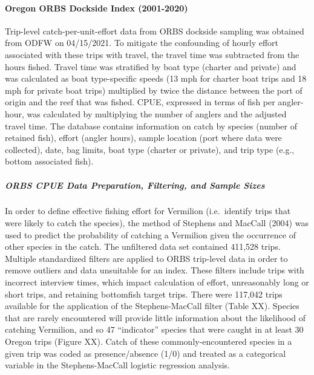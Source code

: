 \documentclass[11pt,
  english,
  a4paper,
]{article}
\begin{document}
\leavevmode\tagmcend\tagstructend


\hypertarget{oregon-orbs-dockside-index-2001-2020}{%
\paragraph{Oregon ORBS Dockside Index (2001-2020)}\label{oregon-orbs-dockside-index-2001-2020}}

\leavevmode\tagmcend\tagstructend


Trip-level catch-per-unit-effort data from ORBS dockside sampling was obtained from ODFW on 04/15/2021. To mitigate the confounding of hourly effort associated with these trips with travel, the travel time was subtracted from the hours fished. Travel time was stratified by boat type (charter and private) and was calculated as boat type-specific speeds (13 mph for charter boat trips and 18 mph for private boat trips) multiplied by twice the distance between the port of origin and the reef that was fished. CPUE, expressed in terms of fish per angler-hour, was calculated by multiplying the number of anglers and the adjusted travel time. The database contains information on catch by species (number of retained fish), effort (angler hours), sample location (port where data were collected), date, bag limits, boat type (charter or private), and trip type (e.g., bottom associated fish).

\leavevmode\tagmcend\tagstructend\par


\hypertarget{orbs-cpue-data-preparation-filtering-and-sample-sizes}{%
\subparagraph{ORBS CPUE Data Preparation, Filtering, and Sample Sizes}\label{orbs-cpue-data-preparation-filtering-and-sample-sizes}}

\leavevmode\tagmcend\tagstructend


In order to define effective fishing effort for Vermilion (i.e.~identify trips that were likely to catch the species), the method of Stephens and MacCall (2004) was used to predict the probability of catching a Vermilion given the occurrence of other species in the catch. The unfiltered data set contained 411,528 trips. Multiple standardized filters are applied to ORBS trip-level data in order to remove outliers and data unsuitable for an index. These filters include trips with incorrect interview times, which impact calculation of effort, unreasonably long or short trips, and retaining bottomfish target trips. There were 117,042 trips available for the application of the Stephens-MacCall filter (Table XX). Species that are rarely encountered will provide little information about the likelihood of catching Vermilion, and so 47 ``indicator'' species that were caught in at least 30 Oregon trips (Figure XX). Catch of these commonly-encountered species in a given trip was coded as presence/absence (1/0) and treated as a categorical variable in the Stephens-MacCall logistic regression analysis.
\end{document}
